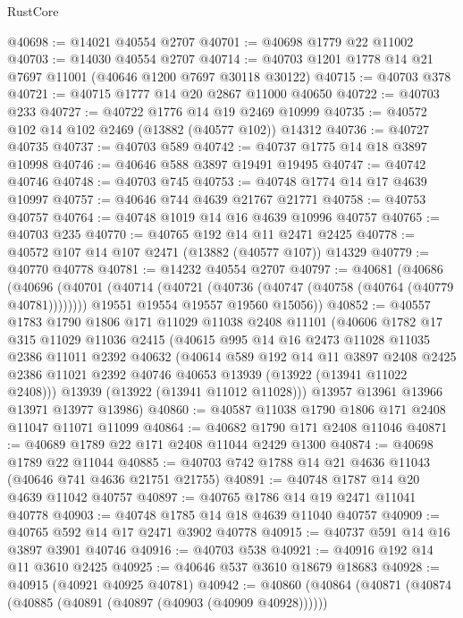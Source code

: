 \begin{lexlean}{RustCore}
\begin{coremodule}
@40698 := @14021 @40554 @2707
@40701 := @40698 @1779 @22 @11002
@40703 := @14030 @40554 @2707
@40714 := @40703 @1201 @1778 @14 @21 @7697 @11001 (@40646 @1200 @7697 @30118 @30122)
@40715 := @40703 @378
@40721 := @40715 @1777 @14 @20 @2867 @11000 @40650
@40722 := @40703 @233
@40727 := @40722 @1776 @14 @19 @2469 @10999
@40735 := @40572 @102 @14 @102 @2469 (@13882 (@40577 @102)) @14312
@40736 := @40727 @40735
@40737 := @40703 @589
@40742 := @40737 @1775 @14 @18 @3897 @10998
@40746 := @40646 @588 @3897 @19491 @19495
@40747 := @40742 @40746
@40748 := @40703 @745
@40753 := @40748 @1774 @14 @17 @4639 @10997
@40757 := @40646 @744 @4639 @21767 @21771
@40758 := @40753 @40757
@40764 := @40748 @1019 @14 @16 @4639 @10996 @40757
@40765 := @40703 @235
@40770 := @40765 @192 @14 @11 @2471 @2425
@40778 := @40572 @107 @14 @107 @2471 (@13882 (@40577 @107)) @14329
@40779 := @40770 @40778
@40781 := @14232 @40554 @2707
@40797 := @40681
    (@40686
      (@40696
        (@40701 (@40714 (@40721 (@40736 (@40747 (@40758 (@40764 (@40779 @40781))))))))
        @19551
        @19554
        @19557
        @19560
        @15056))
@40852 := @40557
    @1783
    @1790
    @1806
    @171
    @11029
    @11038
    @2408
    @11101
    (@40606
      @1782
      @17
      @315
      @11029
      @11036
      @2415
      (@40615
        @995
        @14
        @16
        @2473
        @11028
        @11035
        @2386
        @11011
        @2392
        @40632
        (@40614
          @589
          @192
          @14
          @11
          @3897
          @2408
          @2425
          @2386
          @11021
          @2392
          @40746
          @40653
          @13939
          (@13922 (@13941 @11022 @2408)))
        @13939
        (@13922 (@13941 @11012 @11028)))
      @13957
      @13961
      @13966
      @13971
      @13977
      @13986)
@40860 := @40587 @11038 @1790 @1806 @171 @2408 @11047 @11071 @11099
@40864 := @40682 @1790 @171 @2408 @11046
@40871 := @40689 @1789 @22 @171 @2408 @11044 @2429 @1300
@40874 := @40698 @1789 @22 @11044
@40885 := @40703 @742 @1788 @14 @21 @4636 @11043 (@40646 @741 @4636 @21751 @21755)
@40891 := @40748 @1787 @14 @20 @4639 @11042 @40757
@40897 := @40765 @1786 @14 @19 @2471 @11041 @40778
@40903 := @40748 @1785 @14 @18 @4639 @11040 @40757
@40909 := @40765 @592 @14 @17 @2471 @3902 @40778
@40915 := @40737 @591 @14 @16 @3897 @3901 @40746
@40916 := @40703 @538
@40921 := @40916 @192 @14 @11 @3610 @2425
@40925 := @40646 @537 @3610 @18679 @18683
@40928 := @40915 (@40921 @40925 @40781)
@40942 := @40860
    (@40864
      (@40871
        (@40874 (@40885 (@40891 (@40897 (@40903 (@40909 @40928))))))

\end{coremodule}
\end{lexlean}
